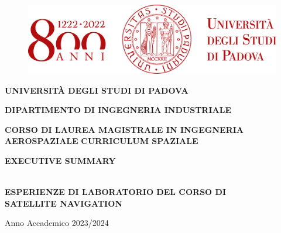 \documentclass[a4paper,11pt,twoside]{book}
\begin{document}
	
	\frontmatter
	
	\begin{titlepage}
		
		\begin{figure}[H]
			\centering
			\includegraphics[scale=0.9]{"Immagini workbook/1"}
		\end{figure}
				
		
		\begin{center}
			
			\vspace{1cm}
			
			\LARGE{\textbf{UNIVERSITÀ DEGLI STUDI DI PADOVA}}
			
			\vspace{0.5cm}
			
			\Large{\textbf{DIPARTIMENTO DI INGEGNERIA INDUSTRIALE}}
			
			\vspace{0.3cm}
			
			\large{\textbf{CORSO DI LAUREA MAGISTRALE IN INGEGNERIA AEROSPAZIALE}}
			\large{\textbf{CURRICULUM SPAZIALE}}
		\end{center}
		
		\vspace{3.5cm}
		
		\begin{center}
			\huge{\textbf{EXECUTIVE SUMMARY}}
			
			\hrulefill \\
			
			\LARGE{\textbf{ESPERIENZE DI LABORATORIO DEL CORSO DI}}\\
			\LARGE{\textbf{SATELLITE NAVIGATION}}
		\end{center}
		
		\vfill
		
		\begin{center}
			\Large{Anno Accademico 2023/2024}
		\end{center}
		
	\end{titlepage}
	
	\thispagestyle{empty}
	
	\cleardoublepage
	
\end{document}
